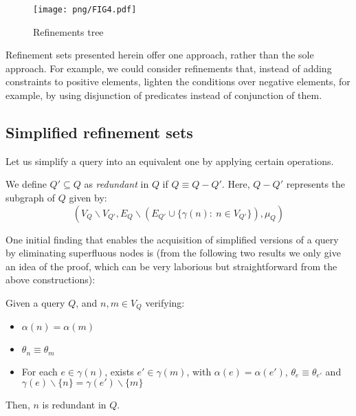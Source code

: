 \documentclass{article}%
\begin{document}
\begin{figure}[h]
    \begin{center}
        \texttt{[image: png/FIG4.pdf]}
    \end{center}
    \caption{%
        Refinements tree
    }%
    \label{arbolGGQ}
\end{figure}

Refinement sets presented herein offer one approach, rather than the sole approach. For example, we could consider refinements that, instead of adding constraints to positive elements, lighten the conditions over negative elements, for example, by using disjunction of predicates instead of conjunction of them.

\subsection{Simplified refinement sets}
\label{simrefs}
Let us simplify a query into an equivalent one by applying certain operations.

\begin{definition}{}
    We define $Q'\subseteq Q$ as \emph{redundant} in $Q$ if $Q\equiv Q-Q'$. Here, $Q-Q'$ represents the subgraph of $Q$ given by:
	$$(V_Q\smallsetminus V_{Q'}, E_Q\smallsetminus (E_{Q'}\cup\{\gamma(n):\ n\in V_{Q'}\}),\mu_Q)$$

\end{definition}\medskip

One initial finding that enables the acquisition of simplified versions of a query by eliminating superfluous nodes is (from the following two results we only give an idea of the proof, which can be very laborious but straightforward from the above constructions):

\begin{theorem}{}
	Given a query $Q$, and $n,m\in V_Q$ verifying:
	\begin{itemize}
		\item $\alpha(n)=\alpha(m)$
		\item $\theta_n\equiv\theta_m$
		\item For each $e\in \gamma(n)$, exists $e'\in \gamma(m)$, with $\alpha(e)=\alpha(e')$, $\theta_e\equiv\theta_{e'}$ and $\gamma(e)\smallsetminus\{n\}=\gamma(e')\smallsetminus\{m\}$
	\end{itemize}
	Then, $n$ is redundant in $Q$.
\end{theorem}
\end{document}
